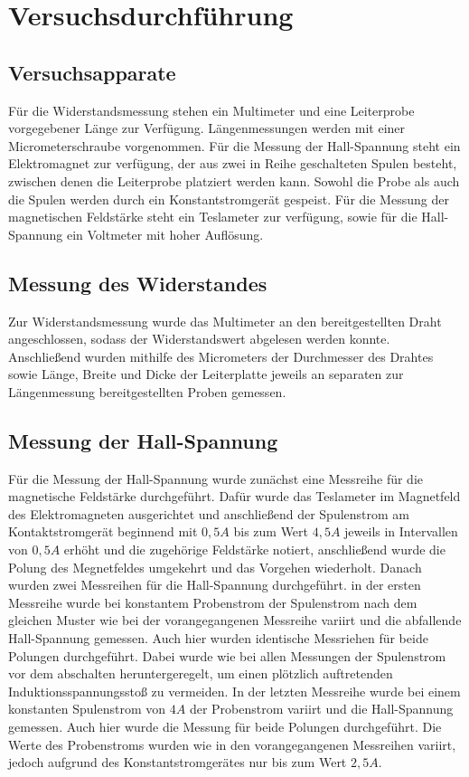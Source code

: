 \section{Versuchsdurchführung}
\subsection{Versuchsapparate}
Für die Widerstandsmessung stehen ein Multimeter und eine Leiterprobe vorgegebener Länge zur Verfügung. Längenmessungen werden mit einer Micrometerschraube vorgenommen. Für die Messung der Hall-Spannung steht ein Elektromagnet zur verfügung, der aus zwei in Reihe geschalteten Spulen besteht, zwischen denen die Leiterprobe platziert werden kann. Sowohl die Probe als auch die Spulen werden durch ein Konstantstromgerät gespeist. Für die Messung der magnetischen Feldstärke steht ein Teslameter zur verfügung, sowie für die Hall-Spannung ein Voltmeter mit hoher Auflösung.
\subsection{Messung des Widerstandes}
Zur Widerstandsmessung wurde das Multimeter an den bereitgestellten Draht angeschlossen, sodass der Widerstandswert abgelesen werden konnte. Anschließend wurden mithilfe des Micrometers der Durchmesser des Drahtes sowie Länge, Breite und Dicke der Leiterplatte jeweils an separaten zur Längenmessung bereitgestellten Proben gemessen.
\subsection{Messung der Hall-Spannung}
Für die Messung der Hall-Spannung wurde zunächst eine Messreihe für die magnetische Feldstärke durchgeführt. Dafür wurde das Teslameter im Magnetfeld des Elektromagneten ausgerichtet und anschließend der Spulenstrom am Kontaktstromgerät
beginnend mit $0,5A$ bis zum Wert $4,5A$ jeweils in Intervallen von $0,5A$ erhöht und die zugehörige Feldstärke notiert, anschließend wurde die Polung des Megnetfeldes umgekehrt und das Vorgehen wiederholt. Danach wurden zwei Messreihen für die Hall-Spannung durchgeführt. in der ersten Messreihe wurde bei konstantem Probenstrom der Spulenstrom nach dem gleichen Muster wie bei der vorangegangenen Messreihe variirt und die abfallende Hall-Spannung gemessen. Auch hier wurden identische Messriehen für beide Polungen durchgeführt. Dabei wurde wie bei allen Messungen der Spulenstrom vor dem abschalten heruntergeregelt, um einen plötzlich auftretenden Induktionsspannungsstoß zu vermeiden. In der letzten Messreihe wurde bei einem konstanten Spulenstrom von $4A$ der Probenstrom variirt und die Hall-Spannung gemessen. Auch hier wurde die Messung für beide Polungen durchgeführt. Die Werte des Probenstroms wurden wie in den vorangegangenen Messreihen variirt, jedoch aufgrund des Konstantstromgerätes nur bis zum Wert $2,5A$. 
